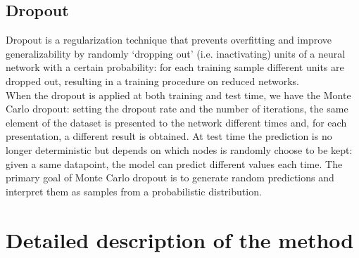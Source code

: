 \documentclass[12pt]{article}
\begin{document}
\subsection{Dropout}
Dropout is a regularization technique that prevents overfitting and improve generalizability by randomly ‘dropping out’ (i.e. inactivating) units of a neural network with a certain probability: for each training sample different units are dropped out, resulting in a training procedure on reduced networks. \cite{bay2}
\\ When the dropout is applied at both training and test time, we have the Monte Carlo dropout: setting the dropout rate and the number of iterations, the same element of the dataset is presented to the network different times and, for each presentation, a different result is obtained. At test time the prediction is no longer deterministic but depends on which nodes is randomly choose to be kept: given a same datapoint, the model can predict different values each time. The primary goal of Monte Carlo dropout is to generate random predictions and interpret them as samples from a probabilistic distribution. \cite{bay3}

\section{Detailed description of the method}
\end{document}
